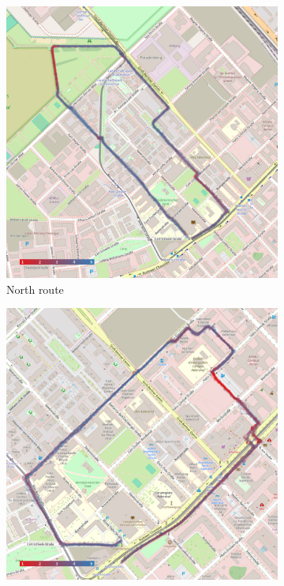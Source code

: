 \begin{figure}[!htb]
    \centering
    \begin{subfigure}{.3333\textwidth}
        \centering
        \includegraphics[width=.9\linewidth]{images/ratings_north_route.jpg}
        \caption{North route}
        \label{fig:ratings_north_route}
    \end{subfigure}%
    \begin{subfigure}{.3333\textwidth}
        \centering
        \includegraphics[width=.9\linewidth]{images/ratings_east_route.jpg}

\end{subfigure}
\end{figure}
